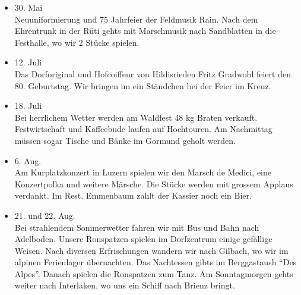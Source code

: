 \begin{history}
\begin{itemize}
        \item[]30. Mai\\
        Neuuniformierung und 75 Jahrfeier der Feldmusik Rain. Nach dem
        Ehrentrunk in der Rüti gehts mit Marschmusik nach Sandblatten in die
        Festhalle, wo wir 2 Stücke spielen.

        \item[]12. Juli\\
        Das Dorforiginal und Hofcoiffeur von Hildisrieden Fritz Gradwohl feiert
        den 80. Geburtstag. Wir bringen im ein Ständchen bei der Feier im Kreuz.

        \item[]18. Juli\\
        Bei herrlichem Wetter werden am Waldfest 48 kg Braten verkauft.
        Festwirtschaft und Kaffeebude laufen auf Hochtouren. Am Nachmittag
        müssen sogar Tische und Bänke im Gormund geholt werden.

        \item[]6. Aug.\\
        Am Kurplatzkonzert in Luzern spielen wir den Marsch de Medici, eine
        Konzertpolka und weitere Märsche. Die Stücke werden mit grossem Applaus
        verdankt. Im Rest. Emmenbaum zahlt der Kassier noch ein Bier.

        \item[]21. und 22. Aug.\\
        Bei strahlendem Sommerwetter fahren wir mit Bus und Bahn nach Adelboden.
        Unsere Ronspatzen spielen im Dorfzentrum einige gefällige Weisen. Nach
        diversen Erfrischungen wandern wir nach Gilbach, wo wir im alpinen
        Ferienlager übernachten. Das Nachtessen gibts im Berggastaush \enquote{Des
            Alpes}. Danach spielen die Ronspatzen zum Tanz. Am Sonntagmorgen gehts
        weiter nach Interlaken, wo uns ein Schiff nach Brienz bringt.


    \end{itemize}

\end{history}
